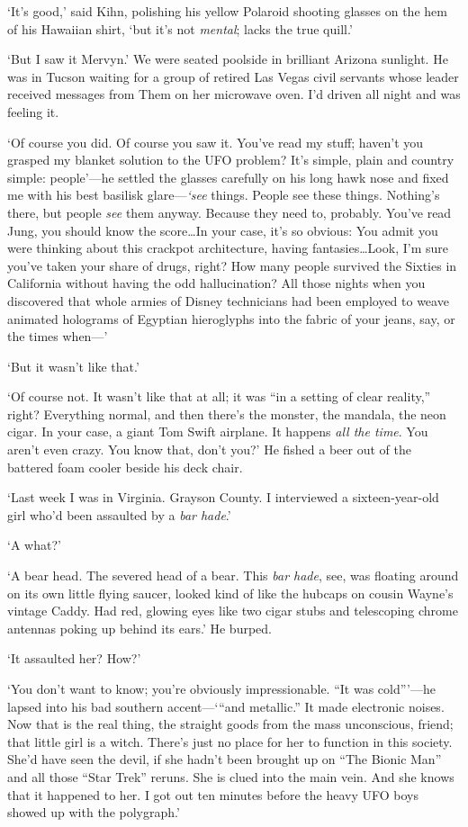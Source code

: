 `It's good,' said Kihn, polishing his yellow Polaroid shooting glasses on the hem of his Hawaiian shirt, `but it's not \textit{mental}; lacks the true quill.'

`But I saw it Mervyn.' We were seated poolside in brilliant Arizona sunlight. He was in Tucson waiting for a group of retired Las Vegas civil servants whose leader received messages from Them on her microwave oven. I'd driven all night and was feeling it.

`Of course you did. Of course you saw it. You've read my stuff; haven't you grasped my blanket solution to the UFO problem? It's simple, plain and country simple: people'---he settled the glasses carefully on his long hawk nose and fixed me with his best basilisk glare---\textit{`see} things. People see these things. Nothing's there, but people \textit{see} them anyway. Because they need to, probably. You've read Jung, you should know the score\ldots In your case, it's so obvious: You admit you were thinking about this crackpot architecture, having fantasies\ldots Look, I'm sure you've taken your share of drugs, right? How many people survived the Sixties in California without having the odd hallucination? All those nights when you discovered that whole armies of Disney technicians had been employed to weave animated holograms of Egyptian hieroglyphs into the fabric of your jeans, say, or the times when---'

`But it wasn't like that.'

`Of course not. It wasn't like that at all; it was “in a setting of clear reality,” right? Everything normal, and then there's the monster, the mandala, the neon cigar. In your case, a giant Tom Swift airplane. It happens \textit{all the time}. You aren't even crazy. You know that, don't you?' He fished a beer out of the battered foam cooler beside his deck chair.

`Last week I was in Virginia. Grayson County. I interviewed a sixteen-year-old girl who'd been assaulted by a \textit{bar hade}.'

`A what?'

`A bear head. The severed head of a bear. This \textit{bar hade}, see, was floating around on its own little flying saucer, looked kind of like the hubcaps on cousin Wayne's vintage Caddy. Had red, glowing eyes like two cigar stubs and telescoping chrome antennas poking up behind its ears.' He burped.

`It assaulted her? How?'

`You don't want to know; you're obviously impressionable. “It was cold”'---he lapsed into his bad southern accent---`“and metallic.” It made electronic noises. Now that is the real thing, the straight goods from the mass unconscious, friend; that little girl is a witch. There's just no place for her to function in this society. She'd have seen the devil, if she hadn't been brought up on “The Bionic Man” and all those “Star Trek” reruns. She is clued into the main vein. And she knows that it happened to her. I got out ten minutes before the heavy UFO boys showed up with the polygraph.'

